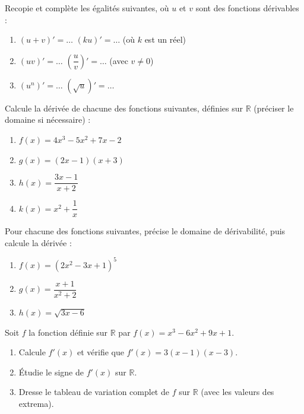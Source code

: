 \documentclass[11pt]{article}
\newcounter{popsec}
\newcounter{popsub}
\newcommand{\courssub}[1]{%
  \stepcounter{popsub}%
  \par\vspace{9pt}\noindent{\popxbold\fontsize{11.5}{13}\selectfont\color{popink}{\color{poporange}\thepopsec.\thepopsub}\hspace{6pt}#1}\par\nopagebreak\vspace{4pt}
}
\begin{document}
\begin{exercice}
Recopie et complète les égalités suivantes, où $u$ et $v$ sont des fonctions dérivables :
\begin{enumerate}
\item $(u + v)' = \ldots$ \qquad $(ku)' = \ldots$ (où $k$ est un réel)
\item $(uv)' = \ldots$ \qquad $\left(\dfrac{u}{v}\right)' = \ldots$ (avec $v \neq 0$)
\item $(u^n)' = \ldots$ \qquad $(\sqrt{u})' = \ldots$
\end{enumerate}
\end{exercice}

\begin{exercice}
Calcule la dérivée de chacune des fonctions suivantes, définies sur $\mathbb{R}$ (préciser le domaine si nécessaire) :
\begin{enumerate}
\item $f(x) = 4x^3 - 5x^2 + 7x - 2$
\item $g(x) = (2x - 1)(x + 3)$
\item $h(x) = \dfrac{3x - 1}{x + 2}$
\item $k(x) = x^2 + \dfrac{1}{x}$
\end{enumerate}
\end{exercice}

\courssub{Je m'entraîne}

\begin{exercice}
Pour chacune des fonctions suivantes, précise le domaine de dérivabilité, puis calcule la dérivée :
\begin{enumerate}
\item $f(x) = (2x^2 - 3x + 1)^5$
\item $g(x) = \dfrac{x + 1}{x^2 + 2}$
\item $h(x) = \sqrt{3x - 6}$
\end{enumerate}
\end{exercice}

\begin{exercice}
Soit $f$ la fonction définie sur $\mathbb{R}$ par $f(x) = x^3 - 6x^2 + 9x + 1$.
\begin{enumerate}
\item Calcule $f'(x)$ et vérifie que $f'(x) = 3(x - 1)(x - 3)$.
\item Étudie le signe de $f'(x)$ sur $\mathbb{R}$.
\item Dresse le tableau de variation complet de $f$ sur $\mathbb{R}$ (avec les valeurs des extrema).
\end{enumerate}
\end{exercice}
\end{document}
